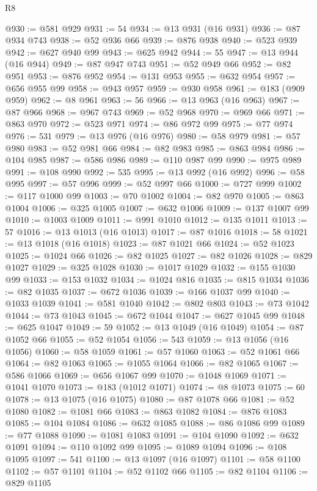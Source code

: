\begin{lexlean}{R8}
\begin{coremodule}
@930 := @581 @929
@931 := 54
@934 := @13 @931 (@16 @931)
@936 := @87 @934 @743
@938 := @52 @936 @66
@939 := @876 @938
@940 := @523 @939
@942 := @627 @940 @99
@943 := @625 @942
@944 := 55
@947 := @13 @944 (@16 @944)
@949 := @87 @947 @743
@951 := @52 @949 @66
@952 := @82 @951
@953 := @876 @952
@954 := @131 @953
@955 := @632 @954
@957 := @656 @955 @99
@958 := @943 @957
@959 := @930 @958
@961 := @183 (@909 @959)
@962 := @8 @961
@963 := 56
@966 := @13 @963 (@16 @963)
@967 := @87 @966
@968 := @967 @743
@969 := @52 @968
@970 := @969 @66
@971 := @863 @970
@972 := @523 @971
@974 := @86 @972 @99
@975 := @77 @974
@976 := 531
@979 := @13 @976 (@16 @976)
@980 := @58 @979
@981 := @57 @980
@983 := @52 @981 @66
@984 := @82 @983
@985 := @863 @984
@986 := @104 @985
@987 := @586 @986
@989 := @110 @987 @99
@990 := @975 @989
@991 := @108 @990
@992 := 535
@995 := @13 @992 (@16 @992)
@996 := @58 @995
@997 := @57 @996
@999 := @52 @997 @66
@1000 := @727 @999
@1002 := @117 @1000 @99
@1003 := @70 @1002
@1004 := @82 @970
@1005 := @863 @1004
@1006 := @325 @1005
@1007 := @632 @1006
@1009 := @137 @1007 @99
@1010 := @1003 @1009
@1011 := @991 @1010
@1012 := @135 @1011
@1013 := 57
@1016 := @13 @1013 (@16 @1013)
@1017 := @87 @1016
@1018 := 58
@1021 := @13 @1018 (@16 @1018)
@1023 := @87 @1021 @66
@1024 := @52 @1023
@1025 := @1024 @66
@1026 := @82 @1025
@1027 := @82 @1026
@1028 := @829 @1027
@1029 := @325 @1028
@1030 := @1017 @1029
@1032 := @155 @1030 @99
@1033 := @153 @1032
@1034 := @1024 @816
@1035 := @815 @1034
@1036 := @82 @1035
@1037 := @672 @1036
@1039 := @166 @1037 @99
@1040 := @1033 @1039
@1041 := @581 @1040
@1042 := @802 @803
@1043 := @73 @1042
@1044 := @73 @1043
@1045 := @672 @1044
@1047 := @627 @1045 @99
@1048 := @625 @1047
@1049 := 59
@1052 := @13 @1049 (@16 @1049)
@1054 := @87 @1052 @66
@1055 := @52 @1054
@1056 := 543
@1059 := @13 @1056 (@16 @1056)
@1060 := @58 @1059
@1061 := @57 @1060
@1063 := @52 @1061 @66
@1064 := @82 @1063
@1065 := @1055 @1064
@1066 := @82 @1065
@1067 := @586 @1066
@1069 := @656 @1067 @99
@1070 := @1048 @1069
@1071 := @1041 @1070
@1073 := @183 (@1012 @1071)
@1074 := @8 @1073
@1075 := 60
@1078 := @13 @1075 (@16 @1075)
@1080 := @87 @1078 @66
@1081 := @52 @1080
@1082 := @1081 @66
@1083 := @863 @1082
@1084 := @876 @1083
@1085 := @104 @1084
@1086 := @632 @1085
@1088 := @86 @1086 @99
@1089 := @77 @1088
@1090 := @1081 @1083
@1091 := @104 @1090
@1092 := @632 @1091
@1094 := @110 @1092 @99
@1095 := @1089 @1094
@1096 := @108 @1095
@1097 := 541
@1100 := @13 @1097 (@16 @1097)
@1101 := @58 @1100
@1102 := @57 @1101
@1104 := @52 @1102 @66
@1105 := @82 @1104
@1106 := @829 @1105

\end{coremodule}
\end{lexlean}
